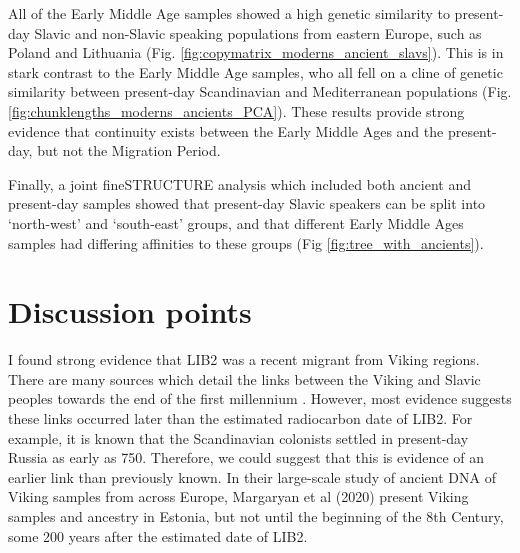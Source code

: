 All of the Early Middle Age samples showed a high genetic similarity to present-day Slavic and non-Slavic speaking populations from eastern Europe, such as Poland and Lithuania (Fig. \ref{fig:copymatrix_moderns_ancient_slavs}). This is in stark contrast to the Early Middle Age samples, who all fell on a cline of genetic similarity between present-day Scandinavian and Mediterranean populations (Fig. \ref{fig:chunklengths_moderns_ancients_PCA}). These results provide strong evidence that continuity exists between the Early Middle Ages and the present-day, but not the Migration Period.

Finally, a joint fineSTRUCTURE analysis which included both ancient and present-day samples showed that present-day Slavic speakers can be split into  `north-west' and `south-east' groups, and that different Early Middle Ages samples had differing affinities to these groups (Fig \ref{fig:tree_with_ancients}). 

\section{Discussion points}


I found strong evidence that LIB2 was a recent migrant from Viking regions. There are many sources which detail the links between the Viking and Slavic peoples towards the end of the first millennium \cite{duczko2004viking, peterson2016vikings}. However, most evidence suggests these links occurred later than the estimated radiocarbon date of LIB2. For example, it is known that the Scandinavian colonists settled in present-day Russia as early as 750. Therefore, we could suggest that this is evidence of an earlier link than previously known. In their large-scale study of ancient DNA of Viking samples from across Europe, Margaryan et al (2020) present Viking samples and ancestry in Estonia, but not until the beginning of the 8th Century, some 200 years after the estimated date of LIB2.  

